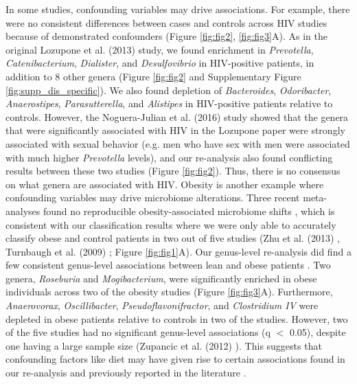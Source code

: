 \documentclass{article}
\begin{document}
In some studies, confounding variables may drive associations.
For example, there were no consistent differences between cases and controls across HIV studies because of demonstrated confounders \cite{noguera2016gut,lozupone2013alterations,hiv-dinh} (Figure \ref{fig:fig2}, \ref{fig:fig3}A).
As in the original Lozupone et al. (2013) \cite{lozupone2013alterations} study, we found enrichment in \textit{Prevotella}, \textit{Catenibacterium}, \textit{Dialister}, and \textit{Desulfovibrio} in HIV-positive patients, in addition to 8 other genera (Figure \ref{fig:fig2} and Supplementary Figure \ref{fig:supp_dis_specific}).
We also found depletion of \textit{Bacteroides}, \textit{Odoribacter}, \textit{Anaerostipes}, \textit{Parasutterella}, and \textit{Alistipes} in HIV-positive patients relative to controls.
However, the Noguera-Julian et al. (2016) study showed that the genera that were significantly associated with HIV in the Lozupone paper were strongly associated with sexual behavior (e.g. men who have sex with men were associated with much higher \textit{Prevotella} levels), and our re-analysis also found conflicting results between these two studies (Figure \ref{fig:fig2}).
Thus, there is no consensus on what genera are associated with HIV. 
Obesity is another example where confounding variables may drive microbiome alterations.
Three recent meta-analyses found no reproducible obesity-associated microbiome shifts \cite{walters2014meta,Sze07092016,finucane2014obesity}, which is consistent with our classification results where we were only able to accurately classify obese and control patients in two out of five studies (Zhu et al. (2013) \cite{nash-baker}, Turnbaugh et al. (2009) \cite{ob-gordon}; Figure \ref{fig:fig1}A). 
Our genus-level re-analysis did find a few consistent genus-level associations between lean and obese patients \cite{nash-baker,ob-gordon,ob-goodrich,ob-zupancic,ob-ross}.
Two genera, \textit{Roseburia} and \textit{Mogibacterium}, were significantly enriched in obese individuals across two of the obesity studies (Figure \ref{fig:fig3}A). 
Furthermore, \textit{Anaerovorax}, \textit{Oscillibacter}, \textit{Pseudoflavonifractor}, and \textit{Clostridium IV}  were depleted in obese patients relative to controls in two of the studies. 
However, two of the five studies had no significant genus-level associations (q $<$ 0.05), despite one having a large sample size (Zupancic et al. (2012) \cite{ob-zupancic}). 
This suggests that confounding factors like diet may have given rise to certain associations found in our re-analysis and previously reported in the literature \cite{finucane2014obesity}.
\end{document}
